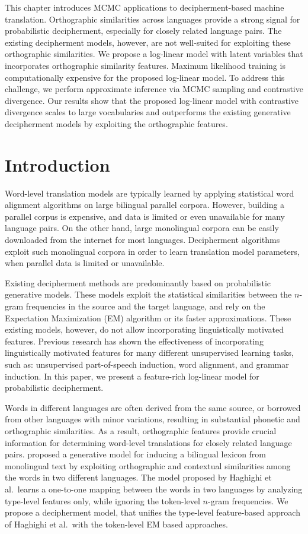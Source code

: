 This chapter introduces MCMC applications to decipherment-based machine translation.
Orthographic similarities across languages provide a strong signal for probabilistic decipherment, especially for closely related language pairs.
The existing decipherment models, however, are not well-suited for exploiting these orthographic similarities.
We propose a log-linear model with latent variables that incorporates orthographic similarity features. 
Maximum likelihood training is computationally expensive for the proposed log-linear model. 
To address this challenge, we perform approximate inference via MCMC sampling and contrastive divergence. 
Our results show that the proposed log-linear model with contrastive divergence scales to large vocabularies and outperforms the existing generative decipherment models by exploiting the orthographic features.
\section{Introduction}
Word-level translation models are typically learned by applying statistical word alignment algorithms on large bilingual parallel corpora. 
However, building a parallel corpus is expensive, and data is limited or even unavailable for many language pairs. 
On the other hand, large monolingual corpora can be easily downloaded from the internet for most languages. 
Decipherment algorithms exploit such monolingual corpora in order to learn translation model parameters, when parallel data is limited or unavailable. 
%

Existing decipherment methods are predominantly based on probabilistic generative models. 
These models exploit the statistical similarities between the $n$-gram frequencies in the source and the target language, and rely on the Expectation Maximization (EM) algorithm or its faster approximations.
These existing models, however, do not allow incorporating linguistically motivated features. 
Previous research has shown the effectiveness of incorporating linguistically motivated features for many different unsupervised learning tasks, such as: unsupervised part-of-speech induction, word alignment, and grammar induction. 
In this paper, we present a feature-rich log-linear model for probabilistic decipherment. 

Words in different languages are often derived from the same source, or borrowed from other languages with minor variations, resulting in substantial phonetic and orthographic similarities.
As a result, orthographic features provide crucial information for determining word-level translations for closely related language pairs.
proposed a generative model for inducing a bilingual lexicon from monolingual text by exploiting orthographic and contextual similarities among the words in two different languages. 
The model proposed by Haghighi et al.\ learns a one-to-one mapping between the words in two languages by analyzing type-level features only, while ignoring the token-level $n$-gram frequencies. 
We propose a decipherment model, that unifies the type-level feature-based approach of Haghighi et al.~with the token-level EM based approaches.

